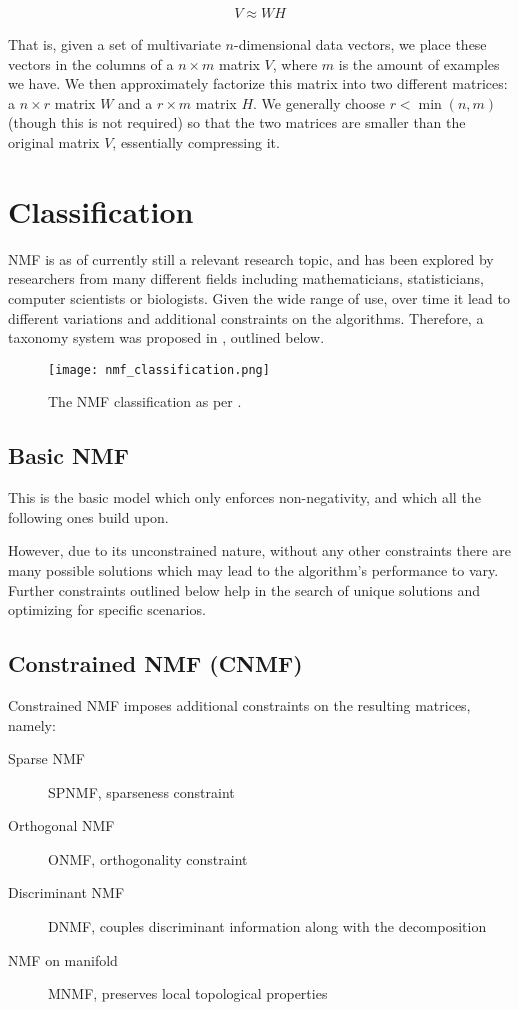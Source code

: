 \begin{align}
V \approx WH
\end{align}

That is, given a set of multivariate $n$-dimensional data vectors, we place these vectors in the columns of a $n \times m$ matrix $V$, where $m$ is the amount of examples we have. We then approximately factorize this matrix into two different matrices: a $n \times r$ matrix $W$ and a $r \times m$ matrix $H$. We generally choose $r < \min(n,m)$ (though this is not required) so that the two matrices are smaller than the original matrix $V$, essentially compressing it. \cite{nmf_algorithms}

\section{Classification}
NMF is as of currently still a relevant research topic, and has been explored by researchers from many different fields including mathematicians, statisticians, computer scientists or biologists. Given the wide range of use, over time it lead to different variations and additional constraints on the algorithms. Therefore, a taxonomy system was proposed in \cite{wang_zhang_2013}, outlined below.

\begin{figure}[ht]
	\caption[NMF classification]{The NMF classification as per \cite{wang_zhang_2013}.}
	\centering
	\texttt{[image: nmf\_classification.png]}
\end{figure}

\subsection{Basic NMF}
This is the basic model which only enforces non-negativity, and which all the following ones build upon.

However, due to its unconstrained nature, without any other constraints there are many possible solutions  which may lead to the algorithm's performance to vary. Further constraints outlined below help in the search of unique solutions and optimizing for specific scenarios.

\subsection{Constrained NMF (CNMF)}
Constrained NMF imposes additional constraints on the resulting matrices, namely:

\begin{description}
	\item[Sparse NMF] SPNMF, sparseness constraint
	\item[Orthogonal NMF] ONMF, orthogonality constraint
	\item[Discriminant NMF] DNMF, couples discriminant information along with the decomposition
	\item[NMF on manifold] MNMF, preserves local topological properties
\end{description}

